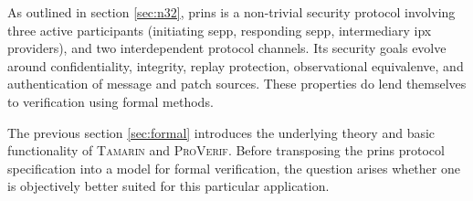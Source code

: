 As outlined in section \ref{sec:n32}, \gls{prins} is a non-trivial security protocol involving three active participants (initiating \gls{sepp}, responding \gls{sepp}, intermediary \gls{ipx} providers), and two interdependent protocol channels.
Its security goals evolve around confidentiality, integrity, replay protection, observational equivalenve, and authentication of message and patch sources.
These properties do lend themselves to verification using formal methods.

The previous section \ref{sec:formal} introduces the underlying theory and basic functionality of \textsc{Tamarin} and \textsc{ProVerif}.
Before transposing the \gls{prins} protocol specification into a model for formal verification, the question arises whether one is objectively better suited for this particular application.
\\

